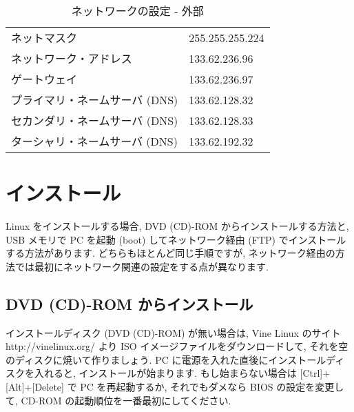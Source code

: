 \documentclass{jarticle}
\begin{document}
\begin{table}[tbp]
\centering
\caption{ネットワークの設定 - 外部} \label{tab:IPset_w}
\begin{tabular}{ll}\hline
ネットマスク &		255.255.255.224 \\
ネットワーク・アドレス &	133.62.236.96 \\
ゲートウェイ &		133.62.236.97 \\
プライマリ・ネームサーバ (DNS) &	133.62.128.32 \\
セカンダリ・ネームサーバ (DNS) &	133.62.128.33 \\
ターシャリ・ネームサーバ (DNS) &	133.62.192.32 \\   \hline
\end{tabular}
\end{table}


\section{インストール}
Linux をインストールする場合, DVD (CD)-ROM からインストールする方法と,
USB メモリで PC を起動 (boot) してネットワーク経由 (FTP) でインストールする方法があります.
どちらもほとんど同じ手順ですが,
ネットワーク経由の方法では最初にネットワーク関連の設定をする点が異なります.

\subsection{DVD (CD)-ROM からインストール}

インストールディスク (DVD (CD)-ROM) が無い場合は, Vine Linux のサイト http://vinelinux.org/ より
ISO イメージファイルをダウンロードして, それを空のディスクに焼いて作りましょう.
PC に電源を入れた直後にインストールディスクを入れると, インストールが始まります.
もし始まらない場合は [Ctrl]+[Alt]+[Delete] で PC を再起動するか,
それでもダメなら BIOS の設定を変更して, CD-ROM の起動順位を一番最初にしてください.
\end{document}
